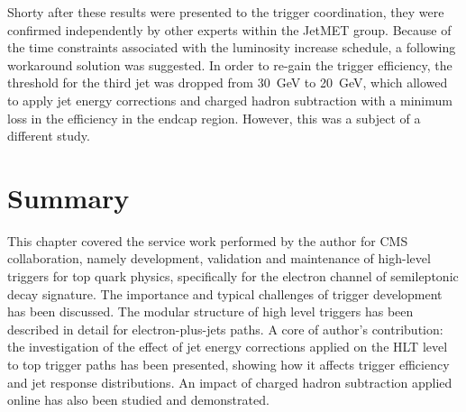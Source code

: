 Shorty after these results were presented to the trigger coordination, they were confirmed independently by other
experts within the JetMET group. Because of the time constraints associated with the luminosity increase schedule, a
following workaround solution was suggested. In order to re-gain the trigger efficiency, the threshold for the third jet
was dropped from \SI{30}{\GeV} to \SI{20}{\GeV}, which allowed to apply jet energy corrections and charged hadron
subtraction with a minimum loss in the efficiency in the endcap region. However, this was a subject of a different
study.

\section{Summary}
This chapter covered the service work performed by the author for CMS collaboration, namely development, validation and
maintenance of high-level triggers for top quark physics, specifically for the electron channel of semileptonic \ttbar
decay signature. The importance and typical challenges of trigger development has been discussed. The modular structure
of high level triggers has been described in detail for electron-plus-jets paths. A core of author's contribution: the
investigation of the effect of jet energy corrections applied on the HLT level to top trigger paths has been presented,
showing how it affects trigger efficiency and jet response distributions. An impact of charged hadron subtraction
applied online has also been studied and demonstrated.



